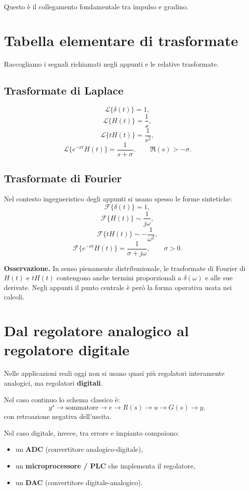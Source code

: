 Questo è il collegamento fondamentale tra impulso e gradino.

\section{Tabella elementare di trasformate}

Raccogliamo i segnali richiamati negli appunti e le relative trasformate.

\subsection*{Trasformate di Laplace}

\[
\mathcal{L}\{\delta(t)\}=1,
\]
\[
\mathcal{L}\{H(t)\}=\frac{1}{s},
\]
\[
\mathcal{L}\{tH(t)\}=\frac{1}{s^2},
\]
\[
\mathcal{L}\{e^{-\sigma t}H(t)\}=\frac{1}{s+\sigma},
\qquad \Re(s)>-\sigma.
\]

\subsection*{Trasformate di Fourier}

Nel contesto ingegneristico degli appunti si usano spesso le forme sintetiche:
\[
\mathcal{F}\{\delta(t)\}=1,
\]
\[
\mathcal{F}\{H(t)\}\sim \frac{1}{j\omega},
\]
\[
\mathcal{F}\{tH(t)\}\sim -\frac{1}{\omega^2},
\]
\[
\mathcal{F}\{e^{-\sigma t}H(t)\}=\frac{1}{\sigma+j\omega},
\qquad \sigma>0.
\]

\medskip

\noindent
\textbf{Osservazione.}
In senso pienamente distribuzionale, le trasformate di Fourier di \(H(t)\) e \(tH(t)\)
contengono anche termini proporzionali a \(\delta(\omega)\) e alle sue derivate.
Negli appunti il punto centrale è però la forma operativa usata nei calcoli.

\section{Dal regolatore analogico al regolatore digitale}

Nelle applicazioni reali oggi non si usano quasi più regolatori interamente analogici,
ma regolatori \textbf{digitali}.

Nel caso continuo lo schema classico è:
\[
y^\star \longrightarrow \text{sommatore} \longrightarrow e \longrightarrow R(s) \longrightarrow u \longrightarrow G(s) \longrightarrow y,
\]
con retroazione negativa dell'uscita.

Nel caso digitale, invece, tra errore e impianto compaiono:
\begin{itemize}
    \item un \textbf{ADC} (convertitore analogico-digitale),
    \item un \textbf{microprocessore / PLC} che implementa il regolatore,
    \item un \textbf{DAC} (convertitore digitale-analogico).
\end{itemize}

